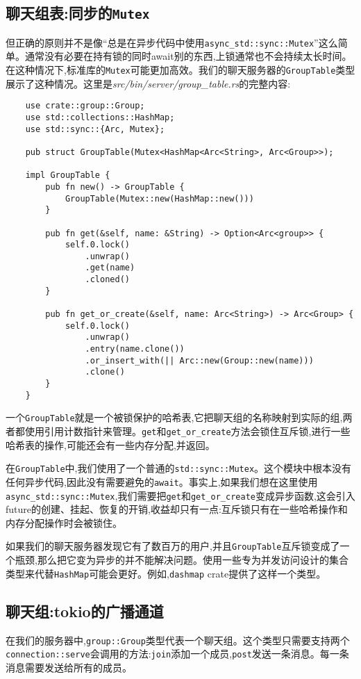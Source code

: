 \subsection{聊天组表:同步的\texttt{Mutex}}
但正确的原则并不是像“总是在异步代码中使用\texttt{async\_std::sync::Mutex}”这么简单。通常没有必要在持有锁的同时await别的东西,上锁通常也不会持续太长时间。在这种情况下,标准库的\texttt{Mutex}可能更加高效。我们的聊天服务器的\texttt{GroupTable}类型展示了这种情况。这里是\emph{src/bin/server/group\_table.rs}的完整内容:
\begin{verbatim}
    use crate::group::Group;
    use std::collections::HashMap;
    use std::sync::{Arc, Mutex};

    pub struct GroupTable(Mutex<HashMap<Arc<String>, Arc<Group>>);

    impl GroupTable {
        pub fn new() -> GroupTable {
            GroupTable(Mutex::new(HashMap::new()))
        }

        pub fn get(&self, name: &String) -> Option<Arc<group>> {
            self.0.lock()
                .unwrap()
                .get(name)
                .cloned()
        }

        pub fn get_or_create(&self, name: Arc<String>) -> Arc<Group> {
            self.0.lock()
                .unwrap()
                .entry(name.clone())
                .or_insert_with(|| Arc::new(Group::new(name)))
                .clone()
        }
    }
\end{verbatim}

一个\texttt{GroupTable}就是一个被锁保护的哈希表,它把聊天组的名称映射到实际的组,两者都使用引用计数指针来管理。\texttt{get}和\texttt{get\_or\_create}方法会锁住互斥锁,进行一些哈希表的操作,可能还会有一些内存分配,并返回。

在\texttt{GroupTable}中,我们使用了一个普通的\texttt{std::sync::Mutex}。这个模块中根本没有任何异步代码,因此没有需要避免的\texttt{await}。事实上,如果我们想在这里使用\texttt{async\_std::sync::Mutex},我们需要把\texttt{get}和\texttt{get\_or\_create}变成异步函数,这会引入future的创建、挂起、恢复的开销,收益却只有一点:互斥锁只有在一些哈希操作和内存分配操作时会被锁住。

如果我们的聊天服务器发现它有了数百万的用户,并且\texttt{GroupTable}互斥锁变成了一个瓶颈,那么把它变为异步的并不能解决问题。使用一些专为并发访问设计的集合类型来代替\texttt{HashMap}可能会更好。例如,\texttt{dashmap} crate提供了这样一个类型。

\subsection{聊天组:tokio的广播通道}
在我们的服务器中,\texttt{group::Group}类型代表一个聊天组。这个类型只需要支持两个\texttt{connection::serve}会调用的方法:\texttt{join}添加一个成员,\texttt{post}发送一条消息。每一条消息需要发送给所有的成员。

